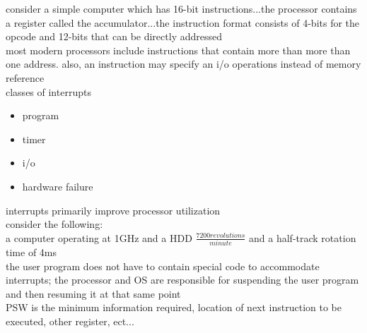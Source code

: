 \documentclass[parindent=0pt]{article}
\begin{document}
consider a simple computer which has 16-bit instructions...the processor contains a register called the accumulator...the instruction format consists of 4-bits for the opcode and 12-bits that can be directly addressed\\

most modern processors include instructions that contain more than more than one address. also, an instruction may specify an i/o operations instead of memory reference\\

classes of interrupts
	\begin{itemize}
		\item program
		\item timer
		\item i/o
		\item hardware failure
	\end{itemize}

interrupts primarily improve processor utilization\\
consider the following:\\
a computer operating at 1GHz and a HDD $\frac{7200revolutions}{minute}$ and a half-track rotation time of 4ms\\

the user program does not have to contain special code to accommodate interrupts; the processor and OS are responsible for suspending the user program and then resuming it at that same point\\

PSW is the minimum information required, location of next instruction to be executed, other register, ect...\\
\end{document}
